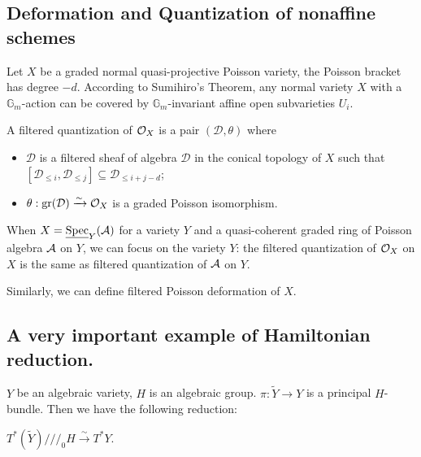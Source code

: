 

\subsection{Deformation and Quantization of nonaffine schemes}

Let $X$ be a graded normal quasi-projective Poisson variety, the Poisson bracket has degree $-d$. According to Sumihiro's Theorem, any normal variety $X$ with a $\mathbb{G}_m$-action can be covered by $\mathbb{G}_m$-invariant affine open subvarieties $U_i$.

\begin{defn}
  A filtered quantization of $\mathcal{O}_X$ is a pair $(\mathcal{D},\theta)$ where
  \begin{itemize}
    \item $\mathcal{D}$ is a filtered sheaf of algebra $\mathcal{D}$ in the conical topology of $X$ such that $[\mathcal{D}_{\leq i}, \mathcal{D}_{\leq j}] \subseteq \mathcal{D}_{\leq i+j - d}$;
    \item $\theta: \operatorname{gr}(\mathcal{D}) \xrightarrow{\sim} \mathcal{O}_X$ is a graded Poisson isomorphism.
  \end{itemize}
\end{defn}


\begin{rk}
  When $X = \underline{\operatorname{Spec}}_{Y}(\mathcal{A})$ for a variety $Y$ and a quasi-coherent graded ring of Poisson algebra $\mathcal{A}$ on $Y$, we can focus on the variety $Y$: the filtered quantization of $\mathcal{O}_X$ on $X$ is the same as filtered quantization of $\mathcal{A}$ on $Y$.
\end{rk}

Similarly, we can define filtered Poisson deformation of $X$.

\subsection{A very important example of Hamiltonian reduction.}



$Y$ be an algebraic variety, $H$ is an algebraic group. $\pi: \widetilde{Y} \to Y$ is a principal $H$-bundle. Then we have the following reduction:

\begin{thm}
  $T^*(\widetilde{Y}) \mathbin{/\!/\!/}_0 H \xrightarrow{\sim} T^*Y$.
\end{thm}

